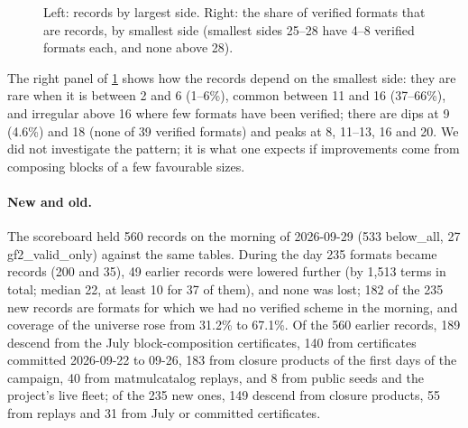 \begin{figure}[t]
\centering
{}\hfill
{}
\caption{Left: records by largest side. Right: the share of verified formats that are records, by smallest side (smallest sides 25--28 have 4--8 verified formats each, and none above 28).}
\label{fig:maxside}
\end{figure}

The right panel of \cref{fig:maxside} shows how the records depend on the smallest side: they are rare when it is between 2 and 6 (1--6\%), common between 11 and 16 (37--66\%), and irregular above 16 where few formats have been verified; there are dips at 9 (4.6\%) and 18 (none of 39 verified formats) and peaks at 8, 11--13, 16 and 20. We did not investigate the pattern; it is what one expects if improvements come from composing blocks of a few favourable sizes.

\paragraph{New and old.}
The scoreboard held 560 records on the morning of 2026-09-29 (533 \textsf{below\_all}, 27 \textsf{gf2\_valid\_only}) against the same tables. During the day 235 formats became records (200 and 35), 49 earlier records were lowered further (by 1{,}513 terms in total; median 22, at least 10 for 37 of them), and none was lost;
182 of the 235 new records are formats for which we had no verified scheme in the morning, and coverage of the universe rose from 31.2\% to 67.1\%.
Of the 560 earlier records, 189 descend from the July block-composition certificates, 140 from certificates committed 2026-09-22 to 09-26, 183 from closure products of the first days of the campaign, 40 from matmulcatalog replays, and 8 from public seeds and the project's live fleet; of the 235 new ones, 149 descend from closure products, 55 from replays and 31 from July or committed certificates.
